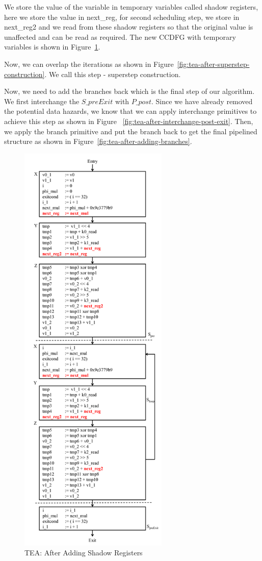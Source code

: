We store the value of the variable in temporary variables called shadow registers, here we store the value in next\_reg, for second scheduling
step, we store in next\_reg2 and we read from these shadow registers so that the original value is unaffected and can be read as required. The new CCDFG with 
temporary variables is shown in Figure~\ref{fig:tea-after-shadow-register}.

Now, we can overlap the iterations as shown in Figure~\ref{fig:tea-after-superstep-construction}. We call this step - superstep construction. 

Now, we need to add the branches back which is the final step of our algorithm. We first interchange the $S\_{preExit}$ with $P\_{post}$. Since we have already removed the potential data hazards, we know that we can apply interchange primitives to achieve this step as shown in Figure ~\ref{fig:tea-after-interchange-post-exit}. Then, we apply the branch primitive and put the branch back to get the final pipelined structure as shown in Figure~\ref{fig:tea-after-adding-branches}.
 

\begin{figure}[H]
\begin{center}
\includegraphics[height=8in]{fig-proposal/tea-after-shadow-reg}
\caption{TEA: After Adding Shadow Registers}
\label{fig:tea-after-shadow-register}
\end{center}
\end{figure}



